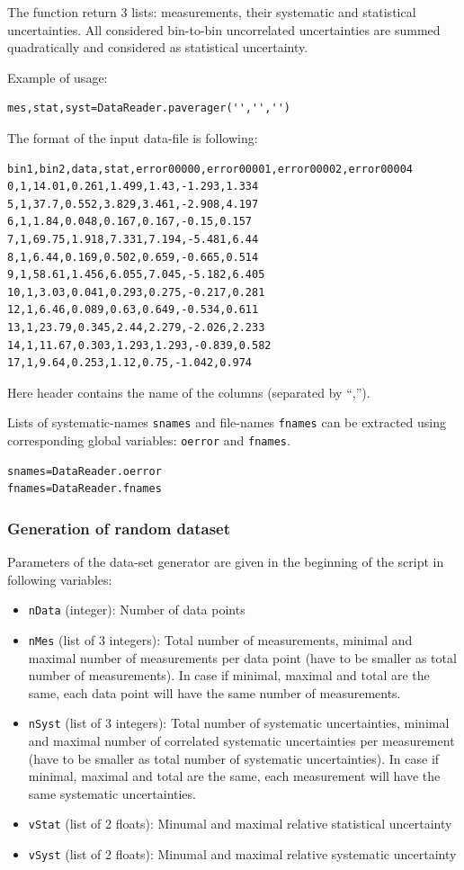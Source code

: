 The function return 3 lists: measurements, their systematic and statistical uncertainties. All considered bin-to-bin uncorrelated uncertainties are summed quadratically and considered as statistical uncertainty.

Example of usage:
\begin{verbatim}
mes,stat,syst=DataReader.paverager('','','')
\end{verbatim}


The format of the input data-file is following:
\begin{verbatim}
bin1,bin2,data,stat,error00000,error00001,error00002,error00004
0,1,14.01,0.261,1.499,1.43,-1.293,1.334
5,1,37.7,0.552,3.829,3.461,-2.908,4.197
6,1,1.84,0.048,0.167,0.167,-0.15,0.157
7,1,69.75,1.918,7.331,7.194,-5.481,6.44
8,1,6.44,0.169,0.502,0.659,-0.665,0.514
9,1,58.61,1.456,6.055,7.045,-5.182,6.405
10,1,3.03,0.041,0.293,0.275,-0.217,0.281
12,1,6.46,0.089,0.63,0.649,-0.534,0.611
13,1,23.79,0.345,2.44,2.279,-2.026,2.233
14,1,11.67,0.303,1.293,1.293,-0.839,0.582
17,1,9.64,0.253,1.12,0.75,-1.042,0.974
\end{verbatim}
Here header contains the name of the columns (separated by ``,'').

Lists of systematic-names {\tt snames} and file-names {\tt fnames} can be extracted using corresponding global variables: {\tt oerror} and {\tt fnames}.

\begin{verbatim}
snames=DataReader.oerror
fnames=DataReader.fnames
\end{verbatim}

\subsubsection{Generation of random dataset}

Parameters of the data-set generator are given in the beginning of the script in following variables:
\begin{itemize}
\item {\tt nData} (integer): Number of data points
\item {\tt nMes} (list of 3 integers): Total number of measurements, minimal and maximal number of measurements per data point (have to be smaller as total number of measurements). In case if minimal, maximal and total are the same, each data point will have the same number of measurements.
\item {\tt nSyst} (list of 3 integers): Total number of systematic uncertainties, minimal and maximal number of correlated systematic uncertainties per measurement (have to be smaller as total number of systematic uncertainties). In case if minimal, maximal and total are the same, each measurement will have the same systematic uncertainties.
\item {\tt vStat} (list of 2 floats): Minumal and maximal relative statistical uncertainty
\item {\tt vSyst} (list of 2 floats): Minumal and maximal relative systematic uncertainty
\end{itemize}


